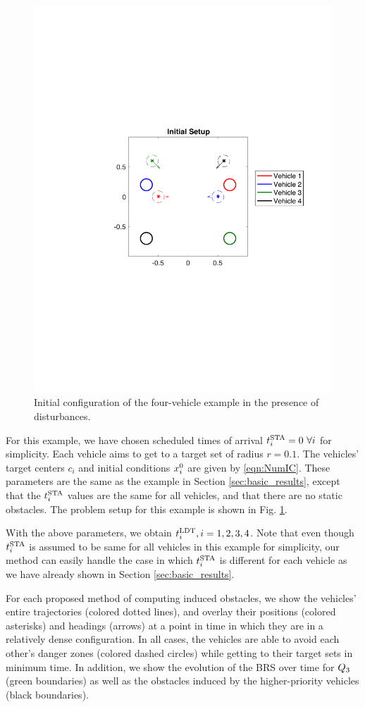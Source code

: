 \begin{figure}[H]
  \centering
  \includegraphics[width=0.8\columnwidth]{fig/init_setup}
  \caption{Initial configuration of the four-vehicle example in the presence of disturbances.}
  \label{fig:init_setup_dstb}
\end{figure}

For this example, we have chosen scheduled times of arrival $t^\text{STA}_i = 0~\forall i$ for simplicity. Each vehicle aims to get to a target set of radius $r=0.1$. The vehicles' target centers $c_i$ and initial conditions $x_i^0$ are given by \eqref{eqn:NumIC}. These parameters are the same as the example in Section \ref{sec:basic_results}, except that the $t^\text{STA}_i$ values are the same for all vehicles, and that there are no static obstacles. The problem setup for this example is shown in Fig. \ref{fig:init_setup_dstb}.

With the above parameters, we obtain $t^\text{LDT}_i, i=1,2,3,4$. Note that even though $t^\text{STA}_i$ is assumed to be same for all vehicles in this example for simplicity, our method can easily handle the case in which $t^\text{STA}_i$ is different for each vehicle as we have already shown in Section \ref{sec:basic_results}.

For each proposed method of computing induced obstacles, we show the vehicles' entire trajectories (colored dotted lines), and overlay their positions (colored asterisks) and headings (arrows) at a point in time in which they are in a relatively dense configuration. In all cases, the vehicles are able to avoid each other's danger zones (colored dashed circles) while getting to their target sets in minimum time. In addition, we show the evolution of the BRS over time for $Q_3$ (green boundaries) as well as the obstacles induced by the higher-priority vehicles (black boundaries). 


